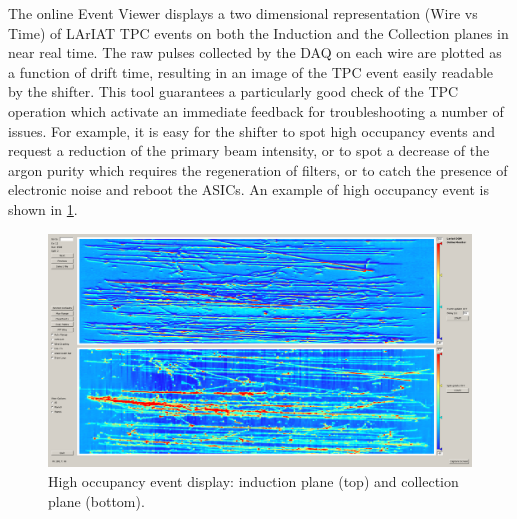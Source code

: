 The online Event Viewer displays a two dimensional representation (Wire vs Time) of LArIAT TPC events  on both the Induction and the Collection planes in near real time. The raw pulses collected by the DAQ on each wire are plotted as a function of drift time, resulting in an image of the TPC event easily readable by the shifter. This tool guarantees a particularly good  check of the TPC operation which activate an immediate feedback for troubleshooting a number of issues. For example,  it is easy for the shifter to spot high occupancy events and request a reduction of the primary beam intensity, or to spot a decrease of the argon purity which requires the regeneration of filters, or to catch the presence of electronic noise and reboot the ASICs. An example of high occupancy event is shown in \ref{fig:highOcc}.

\begin{figure}[htb]
\centering
\includegraphics[scale=0.2]{Chapter-3/Images/highOccupancy.png}
\caption{High occupancy event display: induction plane (top) and collection plane (bottom).}
\label{fig:highOcc}
\end{figure}


